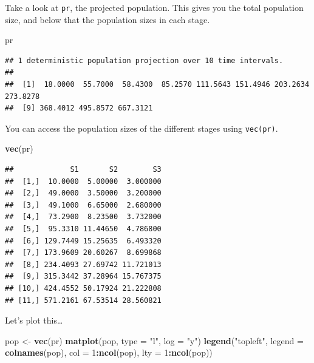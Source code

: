 \documentclass[
  a4paper]{book}
\newenvironment{Shaded}{\begin{snugshade}}{\end{snugshade}}
\newcommand{\AttributeTok}[1]{\textcolor[rgb]{0.13,0.29,0.53}{#1}}
\newcommand{\DecValTok}[1]{\textcolor[rgb]{0.00,0.00,0.81}{#1}}
\newcommand{\FunctionTok}[1]{\textcolor[rgb]{0.13,0.29,0.53}{\textbf{#1}}}
\newcommand{\NormalTok}[1]{#1}
\newcommand{\OtherTok}[1]{\textcolor[rgb]{0.56,0.35,0.01}{#1}}
\newcommand{\SpecialCharTok}[1]{\textcolor[rgb]{0.81,0.36,0.00}{\textbf{#1}}}
\newcommand{\StringTok}[1]{\textcolor[rgb]{0.31,0.60,0.02}{#1}}
\begin{document}
Take a look at \texttt{pr}, the projected population. This gives you the total population size, and below that the population sizes in each stage.

\begin{Shaded}
\begin{Highlighting}[]
\NormalTok{pr}
\end{Highlighting}
\end{Shaded}

\begin{verbatim}
## 1 deterministic population projection over 10 time intervals.
## 
##  [1]  18.0000  55.7000  58.4300  85.2570 111.5643 151.4946 203.2634 273.8278
##  [9] 368.4012 495.8572 667.3121
\end{verbatim}

You can access the population sizes of the different stages using \texttt{vec(pr)}.

\begin{Shaded}
\begin{Highlighting}[]
\FunctionTok{vec}\NormalTok{(pr)}
\end{Highlighting}
\end{Shaded}

\begin{verbatim}
##             S1       S2        S3
##  [1,]  10.0000  5.00000  3.000000
##  [2,]  49.0000  3.50000  3.200000
##  [3,]  49.1000  6.65000  2.680000
##  [4,]  73.2900  8.23500  3.732000
##  [5,]  95.3310 11.44650  4.786800
##  [6,] 129.7449 15.25635  6.493320
##  [7,] 173.9609 20.60267  8.699868
##  [8,] 234.4093 27.69742 11.721013
##  [9,] 315.3442 37.28964 15.767375
## [10,] 424.4552 50.17924 21.222808
## [11,] 571.2161 67.53514 28.560821
\end{verbatim}

Let's plot this\ldots{}

\begin{Shaded}
\begin{Highlighting}[]
\NormalTok{pop }\OtherTok{\textless{}{-}} \FunctionTok{vec}\NormalTok{(pr)}
\FunctionTok{matplot}\NormalTok{(pop, }\AttributeTok{type =} \StringTok{"l"}\NormalTok{, }\AttributeTok{log =} \StringTok{"y"}\NormalTok{)}
\FunctionTok{legend}\NormalTok{(}\StringTok{"topleft"}\NormalTok{, }\AttributeTok{legend =} \FunctionTok{colnames}\NormalTok{(pop), }
       \AttributeTok{col =} \DecValTok{1}\SpecialCharTok{:}\FunctionTok{ncol}\NormalTok{(pop), }\AttributeTok{lty =} \DecValTok{1}\SpecialCharTok{:}\FunctionTok{ncol}\NormalTok{(pop))}
\end{Highlighting}
\end{Shaded}
\end{document}
